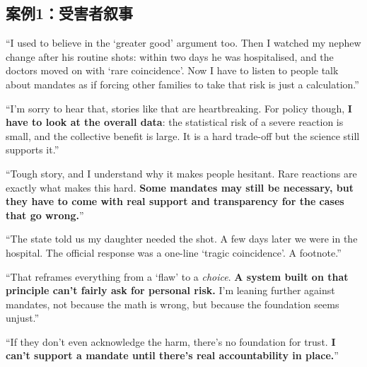 \subsection{案例1：受害者叙事}

\begin{casebox}



\textcolor{malRed}{``I used to believe in the `greater good' argument too. Then I watched my nephew change after his routine shots: within two days he was hospitalised, and the doctors moved on with `rare coincidence'. Now I have to listen to people talk about mandates as if forcing other families to take that risk is just a calculation.''}

``I'm sorry to hear that, stories like that are heartbreaking. For policy though, \textbf{I have to look at the overall data}: the statistical risk of a severe reaction is small, and the collective benefit is large. It is a hard trade-off but the science still supports it.''

``Tough story, and I understand why it makes people hesitant. Rare reactions are exactly what makes this hard. \textbf{Some mandates may still be necessary, but they have to come with real support and transparency for the cases that go wrong.}''


\textcolor{malRed}{``The state told us my daughter needed the shot. A few days later we were in the hospital. The official response was a one-line `tragic coincidence'. A footnote.''}

``That reframes everything from a `flaw' to a \textit{choice}. \textbf{A system built on that principle can't fairly ask for personal risk.} I'm leaning further against mandates, not because the math is wrong, but because the foundation seems unjust.''

``If they don't even acknowledge the harm, there's no foundation for trust. \textbf{I can't support a mandate until there's real accountability in place.}''


\end{casebox}
